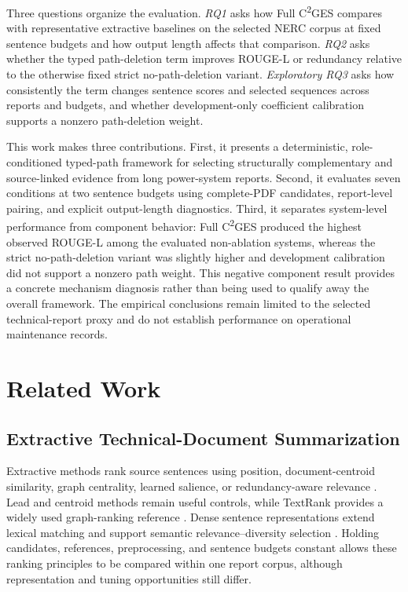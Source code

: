 \documentclass[applsci,article,submit,moreauthors]{Definitions/mdpi}
\newcommand{\cges}{C\textsuperscript{2}GES}
\begin{document}
Three questions organize the evaluation. \textit{RQ1} asks how Full \cges{} compares with representative extractive baselines on the selected NERC corpus at fixed sentence budgets and how output length affects that comparison. \textit{RQ2} asks whether the typed path-deletion term improves ROUGE-L or redundancy relative to the otherwise fixed strict no-path-deletion variant. \textit{Exploratory RQ3} asks how consistently the term changes sentence scores and selected sequences across reports and budgets, and whether development-only coefficient calibration supports a nonzero path-deletion weight.

This work makes three contributions. First, it presents a deterministic, role-conditioned typed-path framework for selecting structurally complementary and source-linked evidence from long power-system reports. Second, it evaluates seven conditions at two sentence budgets using complete-PDF candidates, report-level pairing, and explicit output-length diagnostics. Third, it separates system-level performance from component behavior: Full \cges{} produced the highest observed ROUGE-L among the evaluated non-ablation systems, whereas the strict no-path-deletion variant was slightly higher and development calibration did not support a nonzero path weight. This negative component result provides a concrete mechanism diagnosis rather than being used to qualify away the overall framework. The empirical conclusions remain limited to the selected technical-report proxy and do not establish performance on operational maintenance records.

\section{Related Work}

\subsection{Extractive Technical-Document Summarization}

Extractive methods rank source sentences using position, document-centroid similarity, graph centrality, learned salience, or redundancy-aware relevance \cite{zhong2020extractive,bi2021aredsum,liu2021unsupervised}. Lead and centroid methods remain useful controls, while TextRank provides a widely used graph-ranking reference \cite{mihalcea2004textrank}. Dense sentence representations extend lexical matching and support semantic relevance--diversity selection \cite{reimers2019sentencebert}. Holding candidates, references, preprocessing, and sentence budgets constant allows these ranking principles to be compared within one report corpus, although representation and tuning opportunities still differ.
\end{document}
